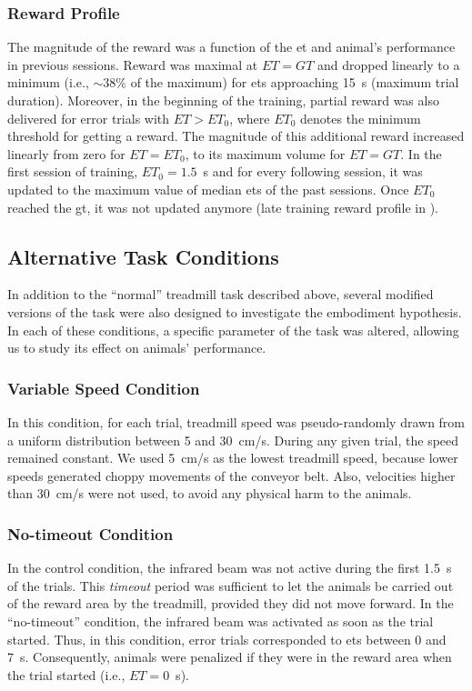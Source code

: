 \subsubsection{Reward Profile} \label{ch:methods:reward}
The magnitude of the reward was a function of the \gls{et} and animal's performance in previous sessions.
Reward was maximal at $ET=GT$ and dropped linearly to a minimum (i.e., $\sim 38\%$ of the maximum) for \glspl{et} approaching 15~s (maximum trial duration).
Moreover, in the beginning of the training, partial reward was also delivered for error trials with $ET>ET_0$, where $ET_0$ denotes the minimum threshold for getting a reward.
The magnitude of this additional reward increased linearly from zero for $ET=ET_0$, to its maximum volume for $ET=GT$.
In the first session of training, $ET_0=1.5$~s and for every following session, it was updated to the maximum value of median \glspl{et} of the past sessions.
Once $ET_0$ reached the \gls{gt}, it was not updated anymore (late training reward profile in ).

\subsection{Alternative Task Conditions}
In addition to the ``normal'' treadmill task described above, several modified versions of the task were also designed to investigate the embodiment hypothesis.
In each of these conditions, a specific parameter of the task was altered, allowing us to study its effect on animals' performance.

\subsubsection{Variable Speed Condition}
In this condition, for each trial, treadmill speed was pseudo-randomly drawn from a uniform distribution between 5 and 30~cm/s.
During any given trial, the speed remained constant.
We used 5~cm/s as the lowest treadmill speed, because lower speeds generated choppy movements of the conveyor belt.
Also, velocities higher than 30~cm/s were not used, to avoid any physical harm to the animals.

\subsubsection{No-timeout Condition}
In the control condition, the infrared beam was not active during the first 1.5~s of the trials.
This \emph{timeout} period was sufficient to let the animals be carried out of the reward area by the treadmill, provided they did not move forward.
In the ``no-timeout'' condition, the infrared beam was activated as soon as the trial started.
Thus, in this condition, error trials corresponded to \glspl{et} between 0 and 7~s.
Consequently, animals were penalized if they were in the reward area when the trial started (i.e., $ET=0$~s).

